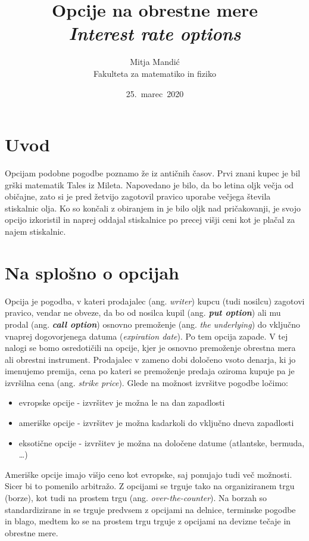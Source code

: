 \documentclass[a4paper]{article}
\title{Opcije na obrestne mere\\
    \textit{Interest rate options}}
\author{Mitja Mandić \\ Fakulteta za matematiko in fiziko}
\date{25.\ marec\ 2020}
\begin{document}
\begin{titlepage}
    \maketitle
    \thispagestyle{empty}
\end{titlepage}
\pagebreak
\tableofcontents
\pagebreak

\section{Uvod}
Opcijam podobne pogodbe poznamo že iz antičnih časov. Prvi znani kupec je bil grški matematik Tales iz Mileta.
Napovedano je bilo, da bo letina oljk večja od običajne, zato si je pred žetvijo zagotovil pravico uporabe večjega
števila stiskalnic olja. Ko so končali z obiranjem in je bilo oljk nad pričakovanji, je svojo opcijo izkoristil in naprej oddajal
stiskalnice po precej višji ceni kot je plačal za najem stiskalnic.

\section{Na splošno o opcijah}

Opcija je pogodba, v kateri prodajalec (ang. \textit{writer}) kupcu (tudi nosilcu) zagotovi pravico, 
vendar ne obveze, da bo od nosilca kupil (ang. \textit{\textbf{put option}})
ali mu prodal (ang. \textit{\textbf{call option}}) osnovno premoženje (ang. \textit{the underlying}) do 
vključno vnaprej dogovorjenega datuma (\textit{expiration date}).
Po tem opcija zapade.  V tej nalogi se bomo osredotičili na opcije, kjer je
osnovno premoženje obrestna mera ali obrestni instrument. Prodajalec v zameno dobi določeno vsoto denarja, ki jo imenujemo premija, 
cena po kateri se premoženje predaja oziroma kupuje pa je izvršilna cena (ang. \textit{strike price}).
Glede na možnost izvršitve pogodbe ločimo:
\begin{itemize}
    \item evropske opcije - izvršitev je možna le na dan zapadlosti
    \item ameriške opcije - izvršitev je možna kadarkoli do vključno dneva zapadlosti
    \item eksotične opcije - izvršitev je možna na določene datume (atlantske, bermuda, \ldots)
\end{itemize}

Ameriške opcije imajo višjo ceno kot evropske, saj ponujajo tudi več možnosti. Sicer bi to pomenilo arbitražo.
Z opcijami se trguje tako na organiziranem trgu (borze), kot tudi na prostem trgu (ang. \textit{over-the-counter}). Na borzah so
standardizirane in se trguje predvsem z opcijami na delnice, terminske pogodbe in blago, medtem ko se na prostem trgu trguje z opcijami
na devizne tečaje in obrestne mere.
\end{document}

